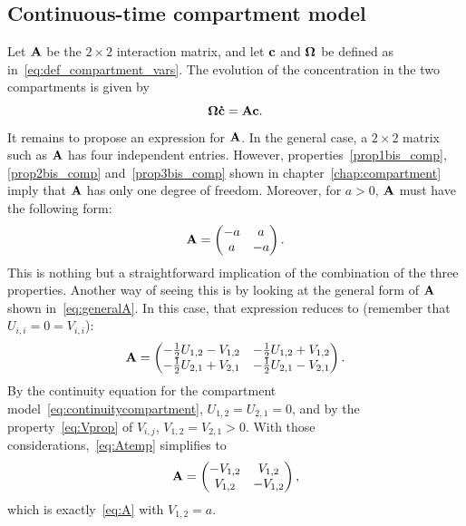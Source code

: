 \subsection{Continuous-time compartment model} \label{sec:ctcm}
Let $\mathbf A$ be the $2 \times 2$ interaction matrix, and let $\mathbf c$ and $\boldsymbol \Omega$ be defined as in~\eqref{eq:def_compartment_vars}. The evolution of the concentration in the two compartments is given by
\begin{equation} \label{eq:generalEDOp2b}
 	\boldsymbol \Omega \mathbf{\dot{c}} = \mathbf A \mathbf c.
\end{equation}
It remains to propose an expression for $\mathbf A$. In the general case, a $2 \times 2$ matrix such as $\mathbf A$ has four independent entries. However, properties~\ref{prop1bis_comp}, \ref{prop2bis_comp} and~\ref{prop3bis_comp} shown in chapter~\ref{chap:compartment} imply that $\mathbf A$ has only one degree of freedom. Moreover, for $a > 0$, $\mathbf A$ must have the following form:
\begin{equation} \label{eq:A}
	\mathbf A = \begin{pmatrix}
		-a & a\\
		a & -a
	\end{pmatrix}.
\end{equation}
This is nothing but a straightforward implication of the combination of the three properties. Another way of seeing this is by looking at the general form of $\mathbf A$ shown in~\eqref{eq:generalA}. In this case, that expression reduces to (remember that $U_{i,i} = 0 = V_{i,i}$):
\begin{equation} \label{eq:Atemp}
	\mathbf A = \begin{pmatrix}
		-\frac{1}{2} U_{1,2} - V_{1,2} & -\frac{1}{2}U_{1,2} + V_{1,2}\\
		-\frac{1}{2}U_{2,1} + V_{2,1} & -\frac{1}{2}U_{2,1} - V_{2,1}
	\end{pmatrix}.
\end{equation}
By the continuity equation for the compartment model~\eqref{eq:continuitycompartment}, $U_{1,2} = U_{2,1} = 0$, and by the property~\eqref{eq:Vprop} of $V_{i,j}$, $V_{1,2} = V_{2,1} > 0$. With those considerations,~\eqref{eq:Atemp} simplifies to
\begin{equation}
	\mathbf A = \begin{pmatrix}
		- V_{1,2} & V_{1,2}\\
		V_{1,2} & -V_{1,2}
	\end{pmatrix},
\end{equation}
which is exactly~\eqref{eq:A} with $V_{1,2} = a$.

